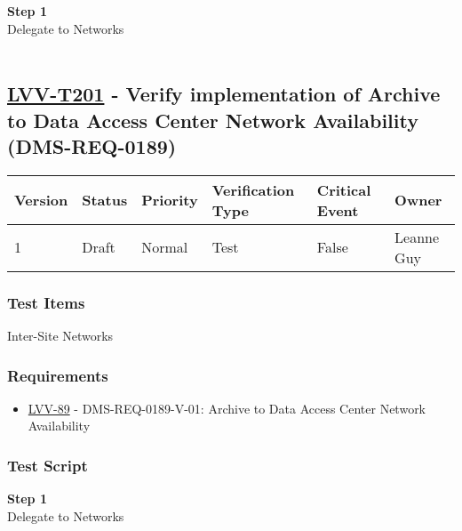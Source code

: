 \textbf{Step 1}\\
Delegate to Networks\\
~\\

\hypertarget{lvv-t201---verify-implementation-of-archive-to-data-access-center-network-availability-dms-req-0189}{%
\subsection{\texorpdfstring{\href{https://jira.lsstcorp.org/secure/Tests.jspa\#/testCase/LVV-T201}{LVV-T201}
- Verify implementation of Archive to Data Access Center Network
Availability
(DMS-REQ-0189)}{LVV-T201 - Verify implementation of Archive to Data Access Center Network Availability (DMS-REQ-0189)}}\label{lvv-t201---verify-implementation-of-archive-to-data-access-center-network-availability-dms-req-0189}}

\begin{longtable}[]{@{}llllll@{}}
\toprule
Version & Status & Priority & Verification Type & Critical Event &
Owner\tabularnewline
\midrule
\endhead
1 & Draft & Normal & Test & False & Leanne Guy\tabularnewline
\bottomrule
\end{longtable}

\hypertarget{test-items-177}{%
\subsubsection{Test Items}\label{test-items-177}}

Inter-Site Networks~

\hypertarget{requirements-178}{%
\subsubsection{Requirements}\label{requirements-178}}

\begin{itemize}
\tightlist
\item
  \href{https://jira.lsstcorp.org/browse/LVV-89}{LVV-89} -
  DMS-REQ-0189-V-01: Archive to Data Access Center Network Availability
\end{itemize}

\hypertarget{test-script-178}{%
\subsubsection{Test Script}\label{test-script-178}}

\textbf{Step 1}\\
Delegate to Networks\\
~\\

